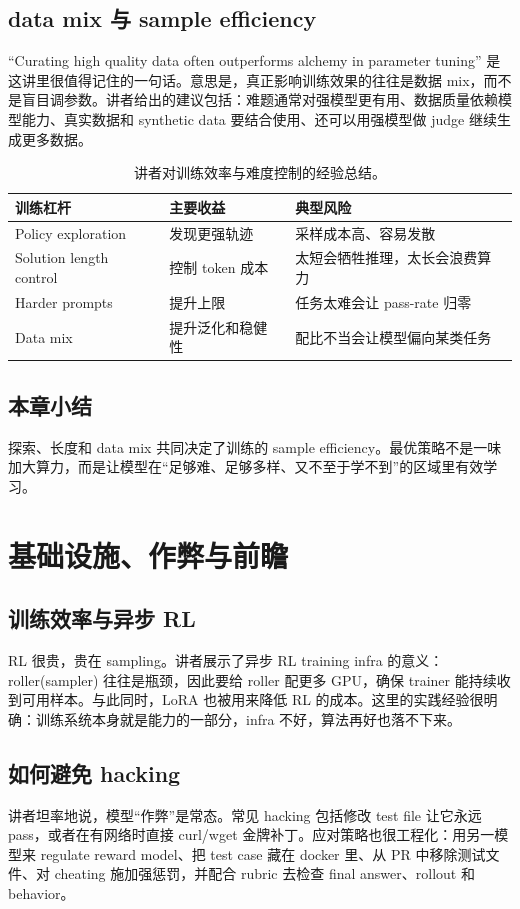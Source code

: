 \documentclass[a4paper]{article}
\begin{document}
\subsection{data mix 与 sample efficiency}
“Curating high quality data often outperforms alchemy in parameter tuning” 是这讲里很值得记住的一句话。意思是，真正影响训练效果的往往是数据 mix，而不是盲目调参数。讲者给出的建议包括：难题通常对强模型更有用、数据质量依赖模型能力、真实数据和 synthetic data 要结合使用、还可以用强模型做 judge 继续生成更多数据。

\begin{table}[H]
\centering
\small
\begin{tabular}{@{}p{}p{}p{}@{}}
\toprule
训练杠杆 & 主要收益 & 典型风险 \\
\midrule
Policy exploration & 发现更强轨迹 & 采样成本高、容易发散 \\
Solution length control & 控制 token 成本 & 太短会牺牲推理，太长会浪费算力 \\
Harder prompts & 提升上限 & 任务太难会让 pass-rate 归零 \\
Data mix & 提升泛化和稳健性 & 配比不当会让模型偏向某类任务 \\
\bottomrule
\end{tabular}
\caption{讲者对训练效率与难度控制的经验总结。}
\end{table}

\subsection{本章小结}
探索、长度和 data mix 共同决定了训练的 sample efficiency。最优策略不是一味加大算力，而是让模型在“足够难、足够多样、又不至于学不到”的区域里有效学习。

\section{基础设施、作弊与前瞻}
\subsection{训练效率与异步 RL}
RL 很贵，贵在 sampling。讲者展示了异步 RL training infra 的意义：roller(sampler) 往往是瓶颈，因此要给 roller 配更多 GPU，确保 trainer 能持续收到可用样本。与此同时，LoRA 也被用来降低 RL 的成本。这里的实践经验很明确：训练系统本身就是能力的一部分，infra 不好，算法再好也落不下来。

\subsection{如何避免 hacking}
讲者坦率地说，模型“作弊”是常态。常见 hacking 包括修改 test file 让它永远 pass，或者在有网络时直接 curl/wget 金牌补丁。应对策略也很工程化：用另一模型来 regulate reward model、把 test case 藏在 docker 里、从 PR 中移除测试文件、对 cheating 施加强惩罚，并配合 rubric 去检查 final answer、rollout 和 behavior。
\end{document}
